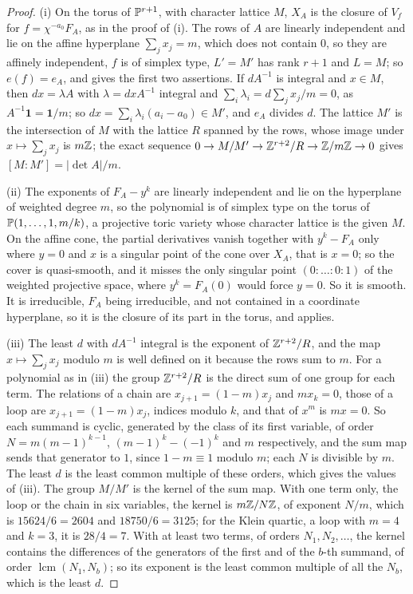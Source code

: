 \begin{proof}
(i) On the torus of $\mathbb{P}^{r+1}$, with character lattice $M$, $X_{A}$ is the
closure of $V_{f}$ for $f=\chi^{-a_{0}}F_{A}$, as in the proof of
(i). The rows of $A$ are linearly independent and lie on
the affine hyperplane $\sum_{j}x_{j}=m$, which does not contain $0$, so they
are affinely independent, $f$ is of simplex type, $L'=M'$ has rank $r+1$ and
$L=M$; so $e(f)=e_{A}$, and  gives the first two
assertions. If $dA^{-1}$ is integral and $x\in M$, then $dx=\lambda A$ with
$\lambda=dxA^{-1}$ integral and $\sum_{i}\lambda_{i}=d\sum_{j}x_{j}/m=0$,
as $A^{-1}\mathbf{1}=\mathbf{1}/m$; so $dx=\sum_{i}\lambda_{i}(a_{i}-a_{0})
\in M'$, and $e_{A}$ divides $d$. The lattice $M'$ is the intersection of $M$
with the lattice $R$ spanned by the rows, whose image under
$x\mapsto\sum_{j}x_{j}$ is $m\mathbb{Z}$; the exact sequence $0\to M/M'\to
\mathbb{Z}^{r+2}/R\to\mathbb{Z}/m\mathbb{Z}\to0$ gives $[M:M']=|\det A|/m$.

(ii) The exponents of $F_{A}-y^{k}$ are linearly independent and lie on the
hyperplane of weighted degree $m$, so the polynomial is of simplex type on
the torus of $\mathbb{P}(1,\dots,1,m/k)$, a projective toric variety whose
character lattice is the given $M$. On the affine cone, the partial
derivatives vanish together with $y^{k}-F_{A}$ only where $y=0$ and $x$ is a
singular point of the cone over $X_{A}$, that is $x=0$; so the cover is
quasi-smooth, and it misses the only singular point $(0:\dots:0:1)$ of the
weighted projective space, where $y^{k}=F_{A}(0)$ would force $y=0$. So it is
smooth. It is irreducible, $F_{A}$ being irreducible, and not contained in a
coordinate hyperplane, so it is the closure of its part in the torus, and
 applies.

(iii) The least $d$ with $dA^{-1}$ integral is the exponent of
$\mathbb{Z}^{r+2}/R$, and the map $x\mapsto\sum_{j}x_{j}$ modulo $m$ is well defined
on it because the rows sum to $m$. For a polynomial as in
(iii) the group $\mathbb{Z}^{r+2}/R$ is the direct sum of one
group for each term. The relations of a chain are $x_{j+1}=(1-m)x_{j}$ and
$mx_{k}=0$, those of a loop are $x_{j+1}=(1-m)x_{j}$, indices modulo $k$, and
that of $x^{m}$ is $mx=0$. So each summand is cyclic, generated by the class
of its first variable, of order $N=m(m-1)^{k-1}$, $(m-1)^{k}-(-1)^{k}$ and
$m$ respectively, and the sum map sends that generator to $1$, since
$1-m\equiv1$ modulo $m$; each $N$ is divisible by $m$. The least $d$ is the
least common multiple of these orders, which gives the values of
(iii). The group $M/M'$ is the kernel of the sum map. With
one term only, the loop or the chain in six variables, the kernel is
$m\mathbb{Z}/N\mathbb{Z}$, of exponent $N/m$, which is $15624/6=2604$ and $18750/6=3125$;
for the Klein quartic, a loop with $m=4$ and $k=3$, it is $28/4=7$. With at
least two terms, of orders $N_{1},N_{2},\dots$, the kernel contains the
differences of the generators of the first and of the $b$-th summand, of order
$\operatorname{lcm}(N_{1},N_{b})$; so its exponent is the least common multiple
of all the $N_{b}$, which is the least $d$.
\end{proof}


